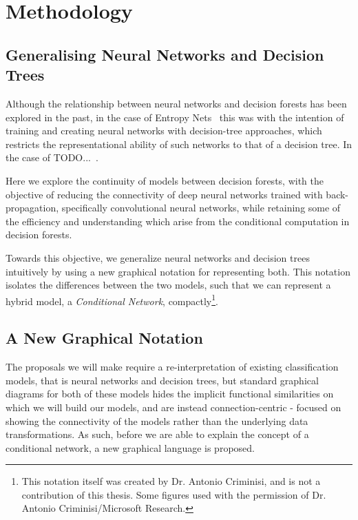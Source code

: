 \documentclass[thesis]{subfiles}
\begin{document}
\chapter{Methodology}
\label{methodology}

\section{Generalising Neural Networks and Decision Trees}
Although the relationship between neural networks and decision forests has been explored in the past, in the case of Entropy Nets~\cite{Sethi1990} this was with the intention of training and creating neural networks with decision-tree approaches, which restricts the representational ability of such networks to that of a decision tree. In the case of TODO...~\cite{Welbl2014casting}.

Here we explore the continuity of models between decision forests, with the objective of reducing the connectivity of deep neural networks trained with back-propagation, specifically convolutional neural networks, while retaining some of the efficiency and understanding which arise from the conditional computation in decision forests.

Towards this objective, we generalize neural networks and decision trees intuitively by using a new graphical notation for representing both. This notation isolates the differences between the two models, such that we can represent a hybrid model, \ie a \emph{Conditional Network}, compactly\footnote{This notation itself was created by Dr. Antonio Criminisi, and is not a contribution of this thesis. Some figures used with the permission of Dr. Antonio Criminisi/Microsoft Research.}.

\section{A New Graphical Notation}
The proposals we will make require a re-interpretation of existing classification models, that is neural networks and decision trees, but standard graphical diagrams for both of these models hides the implicit functional similarities on which we will build our models, and are instead connection-centric - focused on showing the connectivity of the models rather than the underlying data transformations. As such, before we are able to explain the concept of a conditional network, a new graphical language is proposed.
\end{document}
